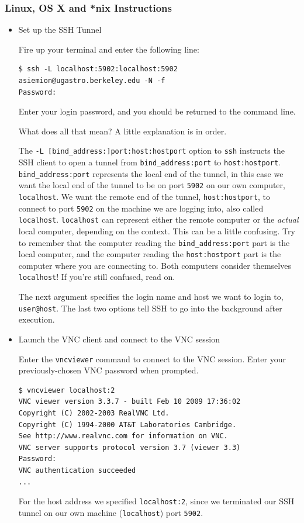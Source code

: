 \documentclass[11pt,preprint]{aastex}
\begin{document}
\begin{itemize}
\begin{enumerate}
\begin{figure}[h!]
\begin{center}
\end{center}
\end{figure}
\end{enumerate}
\end{itemize}

\subsubsection{Linux, OS X and *nix Instructions}
\begin{itemize}
\item Set up the SSH Tunnel

Fire up your terminal and enter the following line:
\begin{verbatim}
$ ssh -L localhost:5902:localhost:5902 asiemion@ugastro.berkeley.edu -N -f
Password: 
\end{verbatim}
Enter your login password, and you should be returned to the command line.  

What does all that mean?  A little explanation is in order.  

The \verb$-L [bind_address:]port:host:hostport$ option to \verb$ssh$ instructs the SSH client to open a tunnel from \verb$bind_address:port$ to \verb$host:hostport$.  \verb$bind_address:port$
represents the local end of the tunnel, in this case we want the local end of the tunnel to be on port \verb$5902$ on our own computer, \verb$localhost$. 
We want the remote end of the tunnel, \verb$host:hostport$, to connect to port \verb$5902$ on the machine we are logging into, also called \verb$localhost$.  \verb$localhost$ can represent either 
the remote computer or the \emph{actual} local computer, depending on the context.  This can be a little confusing.  Try to remember that the computer reading the \verb$bind_address:port$
part is the local computer, and the computer reading the \verb$host:hostport$ part is the computer where you are connecting to.  Both computers consider themselves \verb$localhost$!  If you're 
still confused, read on.

The next argument specifies the login name and host we want to login to, \verb$user@host$.  The last two options tell SSH to go into the background after execution.

\item Launch the VNC client and connect to the VNC session

Enter the \verb$vncviewer$ command to connect to the VNC session.  Enter your previously-chosen VNC password when prompted.
\begin{verbatim}
$ vncviewer localhost:2
VNC viewer version 3.3.7 - built Feb 10 2009 17:36:02
Copyright (C) 2002-2003 RealVNC Ltd.
Copyright (C) 1994-2000 AT&T Laboratories Cambridge.
See http://www.realvnc.com for information on VNC.
VNC server supports protocol version 3.7 (viewer 3.3)
Password: 
VNC authentication succeeded
...
\end{verbatim}
For the host address we specified \verb$localhost:2$, since we terminated our SSH tunnel on our own machine (\verb$localhost$) port \verb$5902$.
\end{itemize}
\end{document}
